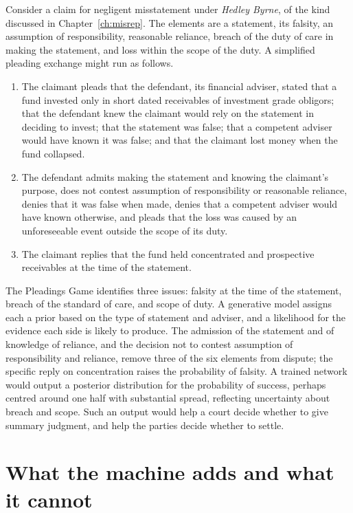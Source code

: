 Consider a claim for negligent misstatement under \emph{Hedley Byrne}, of the kind discussed in Chapter~\ref{ch:misrep}. The elements are a statement, its falsity, an assumption of responsibility, reasonable reliance, breach of the duty of care in making the statement, and loss within the scope of the duty. A simplified pleading exchange might run as follows.
\begin{enumerate}[label=(\alph*)]
\item The claimant pleads that the defendant, its financial adviser, stated that a fund invested only in short dated receivables of investment grade obligors; that the defendant knew the claimant would rely on the statement in deciding to invest; that the statement was false; that a competent adviser would have known it was false; and that the claimant lost money when the fund collapsed.
\item The defendant admits making the statement and knowing the claimant's purpose, does not contest assumption of responsibility or reasonable reliance, denies that it was false when made, denies that a competent adviser would have known otherwise, and pleads that the loss was caused by an unforeseeable event outside the scope of its duty.
\item The claimant replies that the fund held concentrated and prospective receivables at the time of the statement.
\end{enumerate}
The Pleadings Game identifies three issues: falsity at the time of the statement, breach of the standard of care, and scope of duty. A generative model assigns each a prior based on the type of statement and adviser, and a likelihood for the evidence each side is likely to produce. The admission of the statement and of knowledge of reliance, and the decision not to contest assumption of responsibility and reliance, remove three of the six elements from dispute; the specific reply on concentration raises the probability of falsity. A trained network would output a posterior distribution for the probability of success, perhaps centred around one half with substantial spread, reflecting uncertainty about breach and scope. Such an output would help a court decide whether to give summary judgment, and help the parties decide whether to settle.

\section{What the machine adds and what it cannot}

